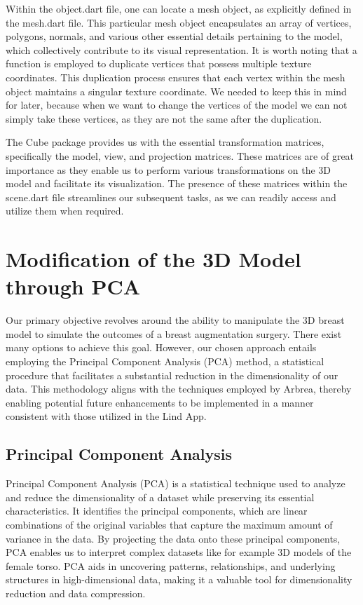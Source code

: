 Within the object.dart file, one can locate a mesh object, as explicitly defined in the mesh.dart file. This particular mesh object encapsulates an 
array of vertices, polygons, normals, and various other essential details pertaining to the model, which collectively contribute to its visual representation. 
It is worth noting that a function is employed to duplicate vertices that possess multiple texture coordinates. 
This duplication process ensures that each vertex within the mesh object maintains a singular texture coordinate. We needed to keep this in mind for later,
because when we want to change the vertices of the model we can not simply take these vertices, as they are not the same after the duplication.

The Cube package provides us with the essential transformation matrices, specifically the model, view, and projection matrices. 
These matrices are of great importance as they enable us to perform various transformations on the 3D model and facilitate its visualization. 
The presence of these matrices within the scene.dart file streamlines our subsequent tasks, as we can readily access and utilize them when required.

\section{Modification of the 3D Model through PCA}\label{sec:modification}

Our primary objective revolves around the ability to manipulate the 3D breast model to simulate the outcomes of a breast augmentation surgery. 
There exist many options to achieve this goal. However, our chosen approach entails employing the Principal Component Analysis (PCA) method, 
a statistical procedure that facilitates a substantial reduction in the dimensionality of our data. This methodology aligns with the techniques employed by Arbrea, 
thereby enabling potential future enhancements to be implemented in a manner consistent with those utilized in the Lind App.

\subsection{Principal Component Analysis}

Principal Component Analysis (PCA) is a statistical technique used to analyze and reduce the dimensionality of a dataset while preserving its essential characteristics. 
It identifies the principal components, which are linear combinations of the original variables that capture the maximum amount of variance in the data. 
By projecting the data onto these principal components, PCA enables us to interpret complex datasets like for example 3D models of the female torso. PCA aids in uncovering patterns, 
relationships, and underlying structures in high-dimensional data, making it a valuable tool for dimensionality reduction and data compression.

